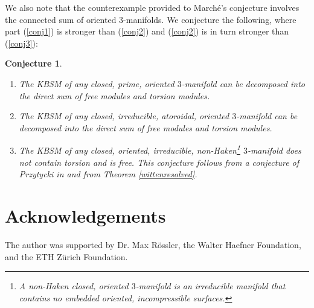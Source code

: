 \documentclass[12pt]{amsproc}
\newtheorem{conjecture}[theorem]{Conjecture}
\begin{document}
We also note that the counterexample provided to Marché's conjecture involves the connected sum of oriented $3$-manifolds. We conjecture the following, where part (\ref{conj1}) is stronger than (\ref{conj2}) and (\ref{conj2}) is in turn stronger than (\ref{conj3}): 

\begin{conjecture} \hfill

\begin{enumerate} 
    \item \label{conj1} The KBSM of any closed, prime, oriented $3$-manifold can be decomposed into the direct sum of free modules and torsion modules.
    
    \item \label{conj2} The KBSM of any closed, irreducible, atoroidal, oriented $3$-manifold can be decomposed into the direct sum of free modules and torsion modules. 
    
    \item \label{conj3} The KBSM of any closed, oriented, irreducible, non-Haken\footnote{A non-Haken closed, oriented $3$-manifold is an irreducible manifold that contains no embedded oriented, incompressible surfaces.} $3$-manifold does not contain torsion and is free. This conjecture follows from a conjecture of Przytycki in \cite{kirbyproblemlist} and from Theorem \ref{wittenresolved}.
\end{enumerate}

\end{conjecture}

\section{Acknowledgements}

The author was supported by Dr. Max Rössler, the Walter Haefner Foundation, and the ETH Zürich Foundation. 
    
\end{document}
